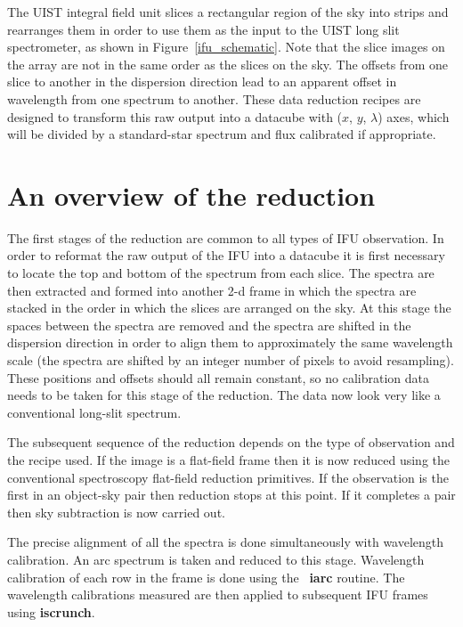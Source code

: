 \documentclass[twoside,11pt]{article}
\newcommand{\xref}[3]{#1}
\renewcommand{\_}{\texttt{\symbol{95}}}
\newcommand{\FIGARO}{\xref{{\sc{Figaro}}}{sun86}{}}
\begin{document}
  The UIST integral field unit slices a rectangular region of the sky
  into strips and rearranges them in order to use them as the input to
  the UIST long slit spectrometer, as shown in
  Figure~\ref{ifu_schematic}. Note that the slice images on the array
  are not in the same order as the slices on the sky. The offsets from
  one slice to another in the dispersion direction lead to an apparent
  offset in wavelength from one spectrum to another. These data
  reduction recipes are designed to transform this raw output into a
  datacube with ($x$, $y$, $\lambda$) axes, which will be
  divided by a standard-star spectrum and flux calibrated if
  appropriate.


\section{An overview of the reduction}

The first stages of the reduction are common to all types of IFU
observation. In order to reformat the raw output of the IFU into a
datacube it is first necessary to locate the top and bottom of the
spectrum from each slice. The spectra are then extracted and formed
into another 2-d frame in which the spectra are stacked in the order
in which the slices are arranged on the sky. At this stage the spaces
between the spectra are removed and the spectra are shifted in the
dispersion direction in order to align them to approximately the same
wavelength scale (the spectra are shifted by an integer number of
pixels to avoid resampling). These positions and offsets should all
remain constant, so no calibration data needs to be taken for this
stage of the reduction. The data now look very like a conventional
long-slit spectrum.

The subsequent sequence of the reduction depends on the type of
observation and the recipe used.  If the image is a flat-field frame
then it is now reduced using the conventional spectroscopy flat-field
reduction primitives. If the observation is the first in an object-sky
pair then reduction stops at this point. If it completes a pair then
sky subtraction is now carried out.

The precise alignment of all the spectra is done simultaneously with
wavelength calibration. An arc spectrum is taken and reduced to this
stage. Wavelength calibration of each row in the frame is done using
the \FIGARO\ \xref{{\bf iarc}}{sun86}{IARC} routine. The
wavelength calibrations measured are then applied to subsequent IFU
frames using \xref{{\bf iscrunch}}{sun86}{ISCRUNCH}.
\end{document}
